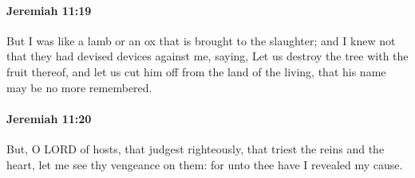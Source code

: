 		\paragraph{Jeremiah 11:19} %
			\label{JEREMIAH-11-19}

			But I was like a lamb or an ox that is brought to the slaughter; and I knew not that they had devised devices against me, saying, Let us destroy the tree with the fruit thereof, and let us cut him off from the land of the living, that his name may be no more remembered.


		\paragraph{Jeremiah 11:20} %
			\label{JEREMIAH-11-20}

			But, O LORD of hosts, that judgest righteously, that triest the reins and the heart, let me see thy vengeance on them: for unto thee have I revealed my cause.

